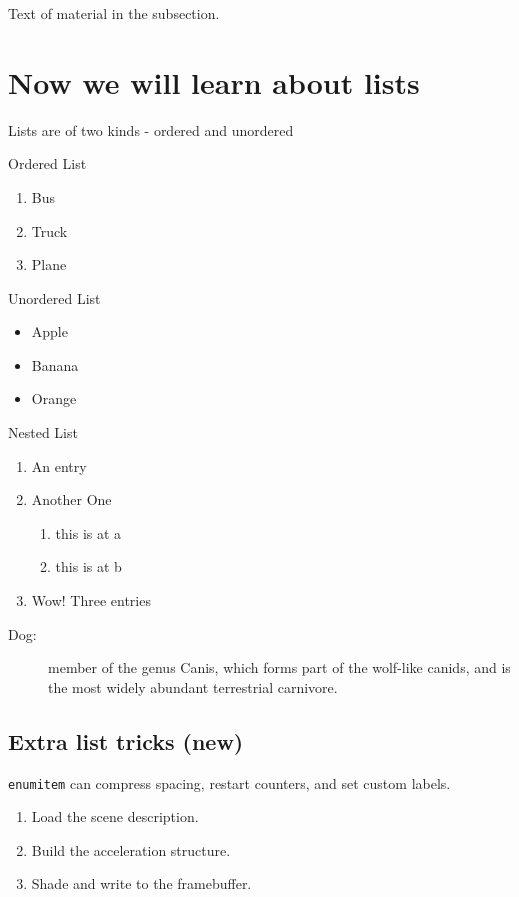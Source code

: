 \documentclass[11pt,a4paper]{article}
\theoremstyle{plain}
\theoremstyle{definition}
\theoremstyle{remark}
\begin{document}
Text of material in the subsection.

\section{Now we will learn about lists}

Lists are of two kinds - ordered and unordered
\vspace{2\baselineskip}

Ordered List
\begin{enumerate}
    \item Bus
    \item Truck
    \item Plane
\end{enumerate}
\vspace{2\baselineskip}

Unordered List
\begin{itemize}
    \item[!] Apple
    \item[-] Banana
    \item Orange
\end{itemize}

\vspace{2\baselineskip}

Nested List
\begin{enumerate}[label=(\roman*)]
  \item An entry
  \item Another One \begin{enumerate}
  \item this is at a
  \item this is at b
  \end{enumerate}
  \item Wow! Three entries
\end{enumerate}

\begin{description}
    \item[Dog:]  member of the genus Canis, which forms part of the wolf-like canids,
  and is the most widely abundant terrestrial carnivore.
\end{description}

\subsection{Extra list tricks (new)}
\texttt{enumitem} can compress spacing, restart counters, and set custom labels.

\begin{enumerate}[label=\textbf{Step \arabic*.}, leftmargin=*, itemsep=0pt]
  \item Load the scene description.
  \item Build the acceleration structure.
  \item Shade and write to the framebuffer.
\end{enumerate}
\end{document}
